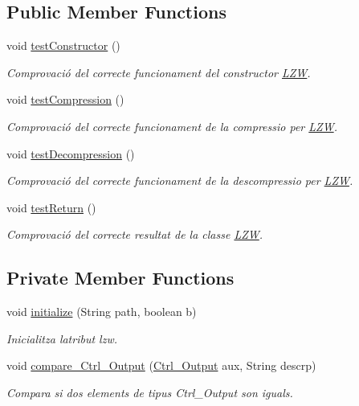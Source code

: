 \subsection*{Public Member Functions}
\begin{DoxyCompactItemize}
\item 
void \hyperlink{classdomini_1_1algorithm_1_1LZWTest_a7a5e6784e3489ec90147d5ce83503671}{test\+Constructor} ()
\begin{DoxyCompactList}\small\item\em Comprovació del correcte funcionament del constructor \hyperlink{classdomini_1_1algorithm_1_1LZW}{L\+ZW}. \end{DoxyCompactList}\item 
void \hyperlink{classdomini_1_1algorithm_1_1LZWTest_ae43f1a846dc9672b04c707314006a878}{test\+Compression} ()
\begin{DoxyCompactList}\small\item\em Comprovació del correcte funcionament de la compressio per \hyperlink{classdomini_1_1algorithm_1_1LZW}{L\+ZW}. \end{DoxyCompactList}\item 
void \hyperlink{classdomini_1_1algorithm_1_1LZWTest_aa9f013d2d8e008768c6c7b8fe319b534}{test\+Decompression} ()
\begin{DoxyCompactList}\small\item\em Comprovació del correcte funcionament de la descompressio per \hyperlink{classdomini_1_1algorithm_1_1LZW}{L\+ZW}. \end{DoxyCompactList}\item 
void \hyperlink{classdomini_1_1algorithm_1_1LZWTest_a09032ce55ab1c698899b14d2a944a65f}{test\+Return} ()
\begin{DoxyCompactList}\small\item\em Comprovació del correcte resultat de la classe \hyperlink{classdomini_1_1algorithm_1_1LZW}{L\+ZW}. \end{DoxyCompactList}\end{DoxyCompactItemize}
\subsection*{Private Member Functions}
\begin{DoxyCompactItemize}
\item 
void \hyperlink{classdomini_1_1algorithm_1_1LZWTest_acf4cac88aafa2144dc8ce3a80453fa90}{initialize} (String path, boolean b)
\begin{DoxyCompactList}\small\item\em Inicialitza l\textquotesingle{}atribut lzw. \end{DoxyCompactList}\item 
void \hyperlink{classdomini_1_1algorithm_1_1LZWTest_a8b2d8aee85d0eb1fdf9bd38f48524968}{compare\+\_\+\+Ctrl\+\_\+\+Output} (\hyperlink{classpersistencia_1_1output_1_1Ctrl__Output}{Ctrl\+\_\+\+Output} aux, String descrp)
\begin{DoxyCompactList}\small\item\em Compara si dos elements de tipus Ctrl\+\_\+\+Output son iguals. \end{DoxyCompactList}\end{DoxyCompactItemize}
